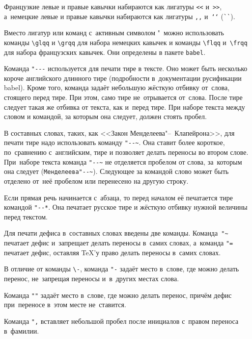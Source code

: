 Французкие левые и правые кавычки набираются
как лигатуры \verb|<<| и~\verb|>>|, а~немецкие левые
и правые кавычки набираются как лигатуры \verb|,,| и~\verb|‘‘| (\verb|``|).

Вместо лигатур или команд с~активным символом "\ можно использовать команды
\verb|\glqq| и \verb|\grqq| для набора немецких кавычек и команды \verb|\flqq|
и~\verb|\frqq| для набора французских кавычек. Они определены в пакете
\verb|babel|.

Команда \verb|"---| используется для печати тире в тексте. Оно может быть
несколько короче английского длинного тире (подробности в~документации
русификации babel). Кроме того, команда задаёт небольшую жёсткую отбивку
от~слова, стоящего перед тире. При этом, само тире не~отрывается от~слова.
После тире следует такая же отбивка от текста, как и~перед тире. При наборе
текста между словом и командой, за которым она следует, должен стоять пробел.

В составных словах, таких, как <<Закон Менделеева"--~Клапейрона>>, для печати
тире надо использовать команду \verb|"--~|. Она ставит более короткое,
по~сравнению с~английским, тире и позволяет делать переносы во втором слове.
При~наборе текста команда \verb|"--~| не отделяется пробелом от слова,
за~которым она следует (\verb|Менделеева"--~|). Следующее за командой слово
может быть  отделено от~неё пробелом или перенесено на другую строку.

Если прямая речь начинается с~абзаца, то перед началом её печатается тире
командой \verb|"--*|. Она печатает русское тире и жёсткую отбивку нужной
величины перед текстом.

Для печати дефиса в~составных словах введены две команды. Команда~\verb|"~|
печатает дефис и~запрещает делать переносы в~самих словах, а~команда \verb|"=|
печатает дефис, оставляя \TeX ’у право делать переносы в~самих словах.

В отличие от команды \verb|\-|, команда \verb|"-| задаёт место в~слове, где
можно делать перенос, не~запрещая переносы и~в~других местах слова.

Команда \verb|""| задаёт место в~слове, где можно делать перенос, причём дефис
при~переносе в~этом месте не~ставится.

Команда \verb|",| вставляет небольшой пробел после инициалов с~правом переноса
в~фамилии.

